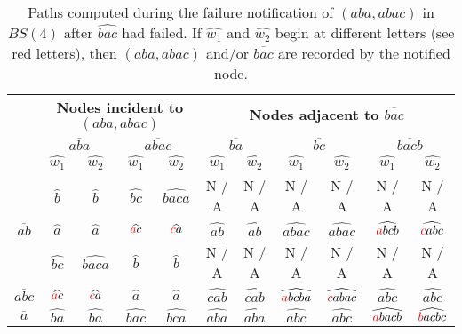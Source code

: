  \begin{table*}[!t]
\begin{minipage}{\textwidth} 
\centering

\caption{Paths computed during the failure notification of  $(aba, abac)$ in $BS(4)$ after $\widehat{bac}$ had failed. If $\widehat{w_1}$ and $\widehat{w_2}$ begin at different letters (see red letters), then $(aba, abac)$ and/or $\overline{bac}$ are recorded by the notified node.}

\label{tb:paths_computed_linkf}
            \small
\begin{tabular}{| c |c c| c c| c c |c c |c c|}
\hline
\rowcolor{gray!30}\multicolumn{1}{|c|}{{\textbf{Notified}}}&\multicolumn{4}{c|}{{\textbf{Nodes incident to $(aba,abac)$}}}&\multicolumn{6}{c|}{{\textbf{Nodes adjacent to $\overline{bac}$}}}\\
\cline{2-11}
\rowcolor{gray!30}\multicolumn{1}{|c|}{{\textbf{node}}}& \multicolumn{2}{c|}{{$\overline{aba}$}} & \multicolumn{2}{c|}{{$\overline{abac}$}} &\multicolumn{2}{c|}{{$\overline{ba}$}} & \multicolumn{2}{c|}{{$\overline{bc}$}} & \multicolumn{2}{c|}{{$\overline{bacb}$}}\\ 
\hline
\hline
\rowcolor{gray!30}\multicolumn{1}{|c|}{\textbf{$\overline{u}$}}& {$\widehat{w_1}$} & $\widehat{w_2}$& {$\widehat{w_1}$} & $\widehat{w_2}$ & {$\widehat{w_1}$} & $\widehat{w_2}$& {$\widehat{w_1}$} & $\widehat{w_2}$& {$\widehat{w_1}$} & $\widehat{w_2}$\\ 
  \hline
  \hline
\rowcolor{gray!10}\multirow{1}{*}{$\overline{ba}$}&$\widehat{b}$&$\widehat{b}$&$\widehat{bc}$ &$\widehat{baca}$ & N / A&N / A& N / A&N / A& N / A&N / A \\   
\multirow{1}{*}{$\overline{ab}$}&$\widehat{a}$&$\widehat{a}$&$\widehat{\textcolor{red}{a}c}$ &$\widehat{\textcolor{red}{c}a}$  &$\widehat{ab}$&$\widehat{ab}$ &$\widehat{abac}$ &$\widehat{abac}$ & $\widehat{\textcolor{red}{a}bcb}$& $\widehat{\textcolor{red}{c}abc}$ \\ 
 \rowcolor{gray!10}\multirow{1}{*}{$\overline{abacb}$}&$\widehat{bc}$&$\widehat{baca}$&$\widehat{b}$ &$\widehat{b}$ & N / A&N / A& N / A&N / A& N / A&N / A \\   
\multirow{1}{*}{$\overline{abc}$}&$\widehat{\textcolor{red}{a}c}$&$\widehat{\textcolor{red}{c}a}$ & $\widehat{a}$ & $\widehat{a}$&$\widehat{cab}$&$\widehat{cab}$ &$\widehat{\textcolor{red}{a}bcba}$&$\widehat{\textcolor{red}{c}abac}$   & $\widehat{abc}$ & $\widehat{abc}$ \\  
 \hline
 \hline
 \multirow{1}{*}{$\overline{a}$}&$\widehat{ba}$&$\widehat{ba}$ &$\widehat{bac}$ &$\widehat{bca}$&$\widehat{aba}$&$\widehat{aba}$&$\widehat{abc}$&$\widehat{abc}$&$\widehat{\textcolor{red}{a}bacb}$&$\widehat{\textcolor{red}{b}acbc}$\\ 

\end{tabular}
\end{minipage}
\end{table*}
